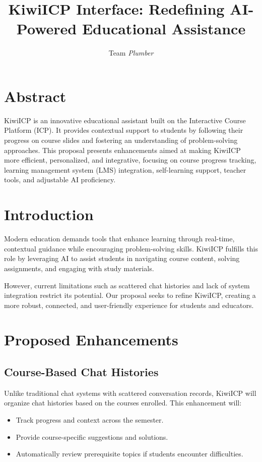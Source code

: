 \documentclass{article}
\title{KiwiICP Interface: Redefining AI-Powered Educational Assistance}
\author{Team \textit{Plumber}}
\date{}
\begin{document}
\maketitle

\section*{Abstract}
KiwiICP is an innovative educational assistant built on the Interactive Course Platform (ICP). It provides contextual support to students by following their progress on course slides and fostering an understanding of problem-solving approaches. This proposal presents enhancements aimed at making KiwiICP more efficient, personalized, and integrative, focusing on course progress tracking, learning management system (LMS) integration, self-learning support, teacher tools, and adjustable AI proficiency.

\section{Introduction}
Modern education demands tools that enhance learning through real-time, contextual guidance while encouraging problem-solving skills. KiwiICP fulfills this role by leveraging AI to assist students in navigating course content, solving assignments, and engaging with study materials.

However, current limitations such as scattered chat histories and lack of system integration restrict its potential. Our proposal seeks to refine KiwiICP, creating a more robust, connected, and user-friendly experience for students and educators.

\section{Proposed Enhancements}
\subsection{Course-Based Chat Histories}
Unlike traditional chat systems with scattered conversation records, KiwiICP will organize chat histories based on the courses enrolled. This enhancement will:
\begin{itemize}
    \item Track progress and context across the semester.
    \item Provide course-specific suggestions and solutions.
    \item Automatically review prerequisite topics if students encounter difficulties.
\end{itemize}
\end{document}
